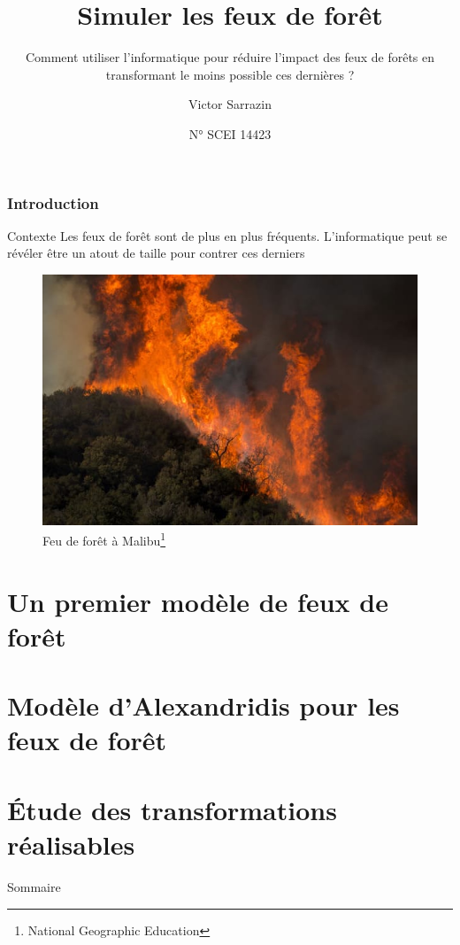 \documentclass{beamer}
\title{Simuler les feux de forêt}
\subtitle{Comment utiliser l'informatique pour réduire l'impact des feux de forêts en transformant le moins possible ces dernières ?}
\author{Victor Sarrazin}
\date{N° SCEI 14423}
\begin{document}

\begin{frame}

    \titlepage

\end{frame}

\begin{frame}
    \frametitle{Introduction \hyperlink{jump}{\beamerbutton{ }} \hypertarget{1}{\beamerbutton{ }}}

    \begin{block}{Contexte}
        Les feux de forêt sont de plus en plus fréquents. L'informatique peut se révéler être un atout de taille pour contrer ces derniers
    \end{block}

    \begin{figure}
        \centering
        \includegraphics[width=0.5\linewidth]{pictures/intro.jpg}
        \caption{Feu de forêt à Malibu\footnote{National Geographic Education}}
        \label{fig:enter-label}
    \end{figure}
\end{frame}


\section{Un premier modèle de feux de forêt}
\section{Modèle d'Alexandridis pour les feux de forêt}
\section{Étude des transformations réalisables}

\begin{frame}{Sommaire \hyperlink{jump}{\beamerbutton{ }} \hypertarget{2}{\beamerbutton{ }}}
    \tableofcontents
\end{frame}
\end{document}
